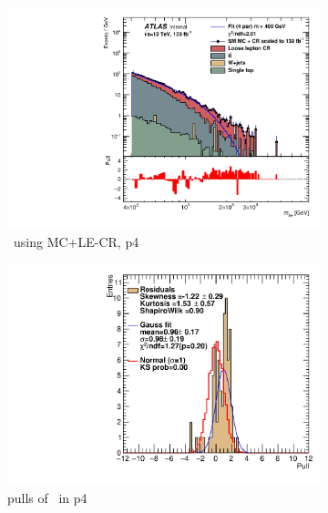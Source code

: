 \newpage

\begin{figure}[ht]
    \centering
    \begin{subfigure}[h]{0.38\linewidth}
    \includegraphics[scale=0.3]{figs/ch6/fit/variable_nosmooth/p4/1PB/output_SMMCplusCR_Mbe_p4.pdf}%
    \caption{\mbe \ using MC+LE-CR, p4}
    \end{subfigure}
    \hfill
    \begin{subfigure}[h]{0.4\linewidth}
    \includegraphics[scale=0.32]{figs/ch6/fit/variable_nosmooth/p4/1PB/pull_SMMCplusCR_Mbe_p4.pdf}%
    \caption{pulls of \mbe \ in p4}
    \end{subfigure}
    \hfill
    \begin{subfigure}[h]{0.38\linewidth}

\end{subfigure}
\end{figure}
